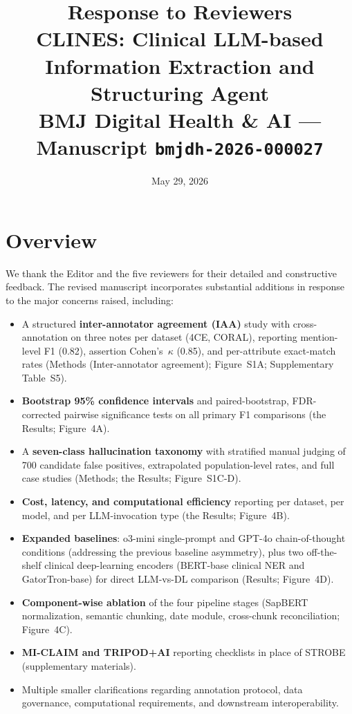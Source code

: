 \documentclass[11pt,letterpaper]{article}
\title{\vspace{-2em}\textbf{Response to Reviewers}\\[0.4em]\large CLINES: Clinical LLM-based Information Extraction and Structuring Agent\\[0.2em]\normalsize BMJ Digital Health \& AI --- Manuscript \texttt{bmjdh-2026-000027}}
\author{}
\date{May 29, 2026}
\begin{document}
\maketitle
\thispagestyle{fancy}
\vspace{-3em}

\section*{Overview}

We thank the Editor and the five reviewers for their detailed and constructive feedback. The revised manuscript incorporates substantial additions in response to the major concerns raised, including:

\begin{itemize}[leftmargin=*]
    \item A structured \textbf{inter-annotator agreement (IAA)} study with cross-annotation on three notes per dataset (4CE, CORAL), reporting mention-level F1 (0.82), assertion Cohen's~$\kappa$ (0.85), and per-attribute exact-match rates (Methods (Inter-annotator agreement); Figure~S1A; Supplementary Table~S5).
    \item \textbf{Bootstrap 95\% confidence intervals} and paired-bootstrap, FDR-corrected pairwise significance tests on all primary F1 comparisons (the Results; Figure~4A).
    \item A \textbf{seven-class hallucination taxonomy} with stratified manual judging of 700 candidate false positives, extrapolated population-level rates, and full case studies (Methods; the Results; Figure~S1C-D).
    \item \textbf{Cost, latency, and computational efficiency} reporting per dataset, per model, and per LLM-invocation type (the Results; Figure~4B).
    \item \textbf{Expanded baselines}: o3-mini single-prompt and GPT-4o chain-of-thought conditions (addressing the previous baseline asymmetry), plus two off-the-shelf clinical deep-learning encoders (BERT-base clinical NER and GatorTron-base) for direct LLM-vs-DL comparison (Results; Figure~4D).
    \item \textbf{Component-wise ablation} of the four pipeline stages (SapBERT normalization, semantic chunking, date module, cross-chunk reconciliation; Figure~4C).
    \item \textbf{MI-CLAIM and TRIPOD+AI} reporting checklists in place of STROBE (supplementary materials).
    \item Multiple smaller clarifications regarding annotation protocol, data governance, computational requirements, and downstream interoperability.
\end{itemize}
\end{document}
